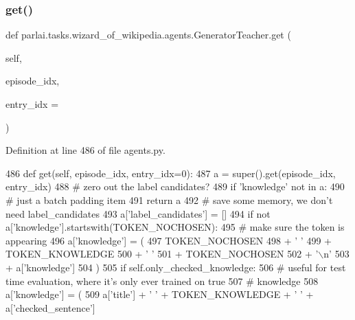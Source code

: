 \subsubsection{\texorpdfstring{get()}{get()}}
{\footnotesize\ttfamily def parlai.\+tasks.\+wizard\+\_\+of\+\_\+wikipedia.\+agents.\+Generator\+Teacher.\+get (\begin{DoxyParamCaption}\item[{}]{self,  }\item[{}]{episode\+\_\+idx,  }\item[{}]{entry\+\_\+idx = {} }\end{DoxyParamCaption})}



Definition at line 486 of file agents.\+py.


\begin{DoxyCode}
486     \textcolor{keyword}{def }get(self, episode\_idx, entry\_idx=0):
487         a = super().get(episode\_idx, entry\_idx)
488         \textcolor{comment}{# zero out the label candidates?}
489         \textcolor{keywordflow}{if} \textcolor{stringliteral}{'knowledge'} \textcolor{keywordflow}{not} \textcolor{keywordflow}{in} a:
490             \textcolor{comment}{# just a batch padding item}
491             \textcolor{keywordflow}{return} a
492         \textcolor{comment}{# save some memory, we don't need label\_candidates}
493         a[\textcolor{stringliteral}{'label\_candidates'}] = []
494         \textcolor{keywordflow}{if} \textcolor{keywordflow}{not} a[\textcolor{stringliteral}{'knowledge'}].startswith(TOKEN\_NOCHOSEN):
495             \textcolor{comment}{# make sure the token is appearing}
496             a[\textcolor{stringliteral}{'knowledge'}] = (
497                 TOKEN\_NOCHOSEN
498                 + \textcolor{stringliteral}{' '}
499                 + TOKEN\_KNOWLEDGE
500                 + \textcolor{stringliteral}{' '}
501                 + TOKEN\_NOCHOSEN
502                 + \textcolor{stringliteral}{'\(\backslash\)n'}
503                 + a[\textcolor{stringliteral}{'knowledge'}]
504             )
505         \textcolor{keywordflow}{if} self.only\_checked\_knowledge:
506             \textcolor{comment}{# useful for test time evaluation, where it's only ever trained on true}
507             \textcolor{comment}{# knowledge}
508             a[\textcolor{stringliteral}{'knowledge'}] = (
509                 a[\textcolor{stringliteral}{'title'}] + \textcolor{stringliteral}{' '} + TOKEN\_KNOWLEDGE + \textcolor{stringliteral}{' '} + a[\textcolor{stringliteral}{'checked\_sentence'}]

\end{DoxyCode}
